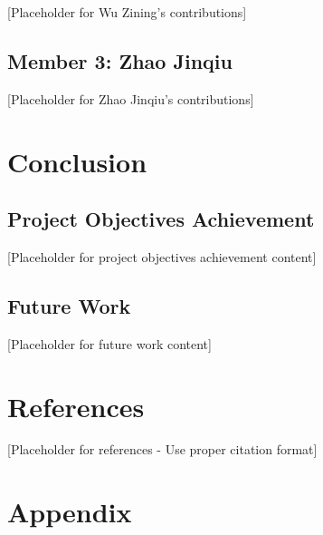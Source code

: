 \documentclass[12pt,a4paper]{article}
\begin{document}

[Placeholder for Wu Zining's contributions]

\subsection{Member 3: Zhao Jinqiu}


[Placeholder for Zhao Jinqiu's contributions]

\section{Conclusion}


\subsection{Project Objectives Achievement}


[Placeholder for project objectives achievement content]

\subsection{Future Work}


[Placeholder for future work content]

\section{References}


[Placeholder for references - Use proper citation format]

\section{Appendix}
\end{document}
